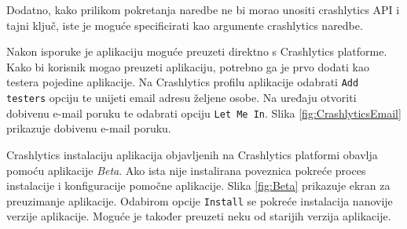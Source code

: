 \documentclass[times, utf8, diplomski, numeric]{fer}
\begin{document}
Dodatno, kako prilikom pokretanja naredbe ne bi morao unositi crashlytics API i tajni ključ, iste je moguće specificirati kao argumente crashlytics naredbe.

Nakon isporuke je aplikaciju moguće preuzeti direktno s Crashlytics platforme. Kako bi korisnik mogao preuzeti aplikaciju, potrebno ga je prvo dodati kao testera pojedine aplikacije. Na Crashlytics profilu aplikacije odabrati \verb|Add testers| opciju te unijeti email adresu željene osobe. Na uređaju otvoriti dobivenu e-mail poruku te odabrati opciju \verb|Let Me In|. Slika \ref{fig:CrashlyticsEmail} prikazuje dobivenu e-mail poruku.

Crashlytics instalaciju aplikacija objavljenih na Crashlytics platformi obavlja pomoću aplikacije \textit{Beta}. Ako ista nije instalirana poveznica pokreće proces instalacije i konfiguracije pomočne aplikacije. Slika \ref{fig:Beta} prikazuje ekran za preuzimanje aplikacije. Odabirom opcije \verb|Install| se pokreće instalacija nanovije verzije aplikacije. Moguće je također preuzeti neku od starijih verzija aplikacije.
\end{document}
